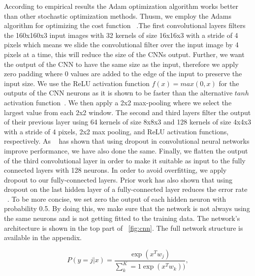\documentclass{article} %
\begin{document}
According to empirical results the Adam optimization algorithm works better than other stochastic optimization methods. Thusm, we employ the Adams algorithm for optimizing the cost function ~\cite{adam}.The first convolutional layers filters the 160x160x3 input images with 32 kernels of size 16x16x3 with a stride of 4 pixels which means we slide the convolutional filter over the input image by 4 pixels at a time, this will reduce the size of the CNNs output. Further, we want the output of the CNN to have the same size as the input, therefore we apply zero padding where 0 values are added to the edge of the input to preserve the input size. We use the ReLU activation function $f(x) = max(0,x)$ for the outputs of the CNN neurons as it is shown to be faster than the alternative $tanh$ activation function~\cite{imagehinton}. We then apply a 2x2 max-pooling where we select the largest value from each 2x2 window. 
The second and third layers filter the output of their previous layer using 64 kernels of size 8x8x3 and 128 kernels of size 4x4x3 with a stride of 4 pixels, 2x2 max pooling, and ReLU activation functions, respectively. As ~\cite{cnndropout2} has shown that using dropout in convolutional neural networks improve performance, we have also done the same.
Finally, we flatten the output of the third convolutional layer in order to make it suitable as input to the fully connected layers with 128 neurons. In order to avoid overfitting, we apply dropout to our fully-connected layers. Prior work has also shown that using dropout on the last hidden layer of a fully-connected layer reduces the error rate ~\cite{cnndropout}. To be more concise, we set zero the output of each hidden neuron with probability 0.5. By doing this, we make sure that the network is not always using the same neurons and is not getting fitted to the training data. The network's architecture is shown in the top part of 
~\ref{fig:cnn}. The full network structure is available in the appendix.

\begin{equation}
  \label{softmax}
  P(y=j | x) = \frac{\exp(x^T w_j)}{\sum^{K}_k=1 \exp(x^T w_k))},
\end{equation}
\end{document}
